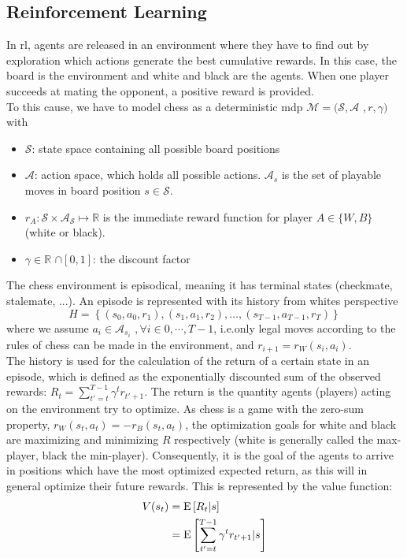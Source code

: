 \documentclass[twocolumn]{phdsymp} %
\begin{document}
\subsection{Reinforcement Learning}
\label{sec:rl}
In \gls{rl}, agents are released in an environment where they have to find out by exploration which actions generate the best cumulative rewards. In this case, the board is the environment and white and black are the agents. When one player succeeds at mating the opponent, a positive reward is provided.\\
To this cause, we have to model chess as a deterministic \gls{mdp} $\mathcal{M}=(\mathcal{S},\mathcal{A}$ $,r,\gamma)$ with \cite{rl}
\begin{itemize}
\item $\mathcal{S}$: state space containing all possible board positions
\item $\mathcal{A}$: action space, which holds all possible actions. ${\mathcal{A}}_s$ is the set of playable moves in board position $s\in \mathcal{S}$.
\item $r_A:\mathcal{S} \times \mathcal{A}_{\mathcal{S}} \mapsto \mathbb{R}$ is the immediate reward function for player $A\in\{W,B\}$ (white or black).
\item $\gamma \in \mathbb{R}$ $ \cap \left[0,1\right]$: the discount factor
\end{itemize}
The chess environment is episodical, meaning it has terminal states (checkmate, stalemate, ...). An episode is represented with its history from whites perspective\[H=\left\{(s_0,a_0,r_1),(s_1,a_1,r_2), \dotso , (s_{T-1},a_{T-1},r_{T})\right\}\]
where we assume $a_i\in {\mathcal{A}}_{s_i}$ $, \forall i \in 0,\cdots,T-1$, i.e.only legal moves according to the rules of chess can be made in the environment, and $r_{i+1}=r_W(s_{i},a_{i})$.\\
The history is used for the calculation of the return of a certain state in an episode, which is defined as the exponentially discounted sum of the observed rewards: $R_{t}=\sum_{t'=t}^{T-1}\gamma^t r_{t'+1}$. The return is the quantity agents (players) acting on the environment try to optimize. As chess is a game with the zero-sum property, $r_W(s_t,a_t)=-r_B(s_t,a_t)$, the optimization goals for white and black are maximizing and minimizing $R$ respectively (white is generally called the max-player, black the min-player). Consequently, it is the goal of the agents to arrive in positions which have the most optimized expected return, as this will in general optimize their future rewards. This is represented by the value function:
\begin{align}
V(s_t) &= \textnormal{E}\left[R_t|s\right] \\
	 &= \textnormal{E}\left[\sum_{t'=t}^{T-1}\gamma^t r_{t'+1}|s\right]
\end{align} 
\end{document}

